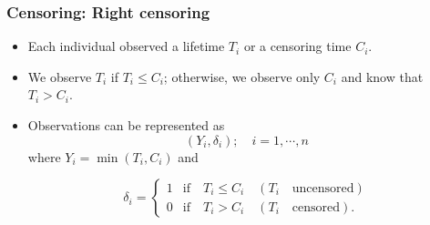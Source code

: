 \documentclass{beamer}
\begin{document}
\begin{frame} \frametitle{Censoring: Right censoring}

\begin{itemize}

\item 
Each individual observed a lifetime $T_i$ or a censoring
time $C_i$.

\item   We observe $T_i$ if $T_i \leq C_i$; otherwise, we
observe only $C_i$ and know that $T_i > C_i$.  

\item Observations can be
represented as $${(Y_i , \delta_i );\quad i = 1, \cdots, n}$$
where $Y_i = \min(T_i, C_i)$ and

\[\delta_i  = \left\{\begin{array}{ll}1 &   \mbox{if} \quad T_i \leq C_i \quad (T_i \quad
    \mbox{uncensored})\\ 0        &  \mbox{if} \quad T_i > C_i \quad (T_i \quad\mbox{censored}).
  \end{array}\right.\]
%

\end{itemize}
\end{frame}

%
%
\end{document}
